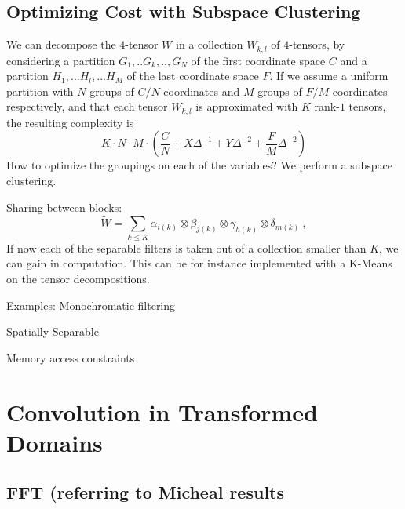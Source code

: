 \documentclass{article}
\begin{document}
\subsection{Optimizing Cost with Subspace Clustering}

We can decompose the $4$-tensor $W$ in a collection $W_{k,l}$ of $4$-tensors, 
by considering a partition $G_1,..G_k,..,G_N$ of the first coordinate space $C$ and
a partition $H_1,...H_l,...H_M$ of the last coordinate space $F$. 
 If we assume a uniform partition with $N$ groups of $C/N$ coordinates and 
 $M$ groups of $F/M$ coordinates respectively, and that each tensor $W_{k,l}$ 
 is approximated with $K$ rank-$1$ tensors, the resulting complexity is 
\begin{equation*}
 K \cdot N \cdot M \cdot \left( \frac{C}{N} + X \Delta^{-1} + Y \Delta^{-2} + \frac{F}{M} \Delta^{-2}\right)
\end{equation*}
 How to optimize the groupings on each of the variables? We perform a subspace clustering. 
 
 
 Sharing between blocks: 
\begin{equation}
\label{rankoptim}
 \widetilde{W} = \sum_{k\leq K} \alpha_{i(k)} \otimes \beta_{j(k)} \otimes \gamma_{h(k)} \otimes \delta_{m(k)}~,
\end{equation}
If now each of the separable filters is taken out of a collection smaller than $K$, we can gain 
in computation. This can be for instance implemented with a K-Means on the tensor decompositions.


Examples:
Monochromatic filtering

Spatially Separable

Memory access constraints

\section{Convolution in Transformed Domains}

\subsection{FFT (referring to Micheal results}
\end{document}
